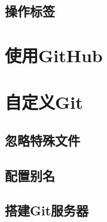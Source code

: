 \subsection{操作标签}

\section{使用GitHub}

\section{自定义Git}

\subsection{忽略特殊文件}

\subsection{配置别名}

\subsection{搭建Git服务器}

